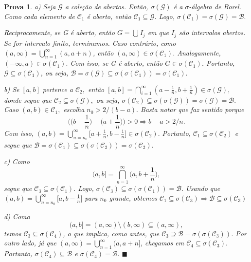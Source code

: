 \documentclass{article}
\newtheorem*{proof*}{\underline{Prova}}
\renewcommand\qedsymbol{$\blacksquare$}
\begin{document}
\begin{proof*}
	a) Seja \(\mathcal{G}\) a coleção de abertos. Então, \(\sigma (\mathcal{G})\) é a \(\sigma \)-álgebra de Borel. Como cada elemento de \(\mathcal{C}_{1}\) é aberto, então \(\mathcal{C}_{1}\subseteq \mathcal{G}.\) Logo,
	\(\sigma(\mathcal{C}_{1}) = \sigma (\mathcal{G}) = \mathcal{B}.\)

	Reciprocamente, se G é aberto, então \(G = \bigcup_{}^{}I_{j}\) em que \(I_{j}\) são intervalos abertos. Se for intervalo finito, terminamos. Caso contrário, como \((a, \infty) = \bigcup_{n=1}^{\infty}(a, a + n)\), então
	\((a, \infty)\in \sigma (\mathcal{C}_{1})\). Analogamente, \((-\infty, a)\in \sigma (\mathcal{C}_{1}).\) Com isso, se G é aberto, então \(G\in \sigma (\mathcal{C}_{1})\). Portanto, \(\mathcal{G}\subseteq \sigma (\mathcal{C}_{1})\), ou seja,
	\(\mathcal{B} = \sigma (\mathcal{G})\subseteq \sigma (\sigma (\mathcal{C}_{1})) = \sigma (\mathcal{C}_{1}).\)

	b) Se \([a, b]\) pertence a \(\mathcal{C}_{2},\) então \([a, b] = \bigcap_{i=1}^{\infty}(a-\frac{1}{n}, b+\frac{1}{n})\in \sigma (\mathcal{G}),\) donde segue que \(\mathcal{C}_{2}\subseteq \sigma (\mathcal{G}),\)
	ou seja, \(\sigma (\mathcal{C}_{2})\subseteq \sigma (\sigma (\mathcal{G})) = \sigma (\mathcal{G}) = \mathcal{B}.\) Caso \((a, b)\in \mathcal{C}_{1},\) escolha \(n_{0} > 2/(b-a).\) Basta notar que faz sentido porque
	\[
		\biggl(\biggl(b-\frac{1}{n}\biggr) - \biggl(a + \frac{1}{n}\biggr)\biggr) > 0 \Rightarrow b - a >2/n.
	\]
	Com isso, \((a, b) = \bigcup_{n=n_{0}}^{\infty}\biggl[a+\frac{1}{n}, b-\frac{1}{n}\biggr]\in \sigma (\mathcal{C}_{2}).\) Portanto, \(\mathcal{C}_{1}\subseteq \sigma (\mathcal{C}_{2})\) e
	segue que \(\mathcal{B} = \sigma (\mathcal{C}_{1})\subseteq \sigma (\sigma (\mathcal{C}_{2})) = \sigma (\mathcal{C}_{2})\).

	c) Como
	\[
		(a, b] = \bigcap_{n=1}^{\infty}\biggl(a, b+\frac{1}{n}\biggr),
	\]
	segue que \(\mathcal{C}_3 \subseteq \sigma (\mathcal{C}_1)\). Logo, \(\sigma (\mathcal{C}_3)\subseteq \sigma (\sigma (\mathcal{C}_1)) = \mathcal{B}.\) Usando que \((a, b) = \bigcup_{n=n_{0}}^{\infty}\biggl[a, b-\frac{1}{n}\biggr]\) para \(n_{0}\) grande,
	obtemos \(\mathcal{C}_{1} \subseteq \sigma (\mathcal{C}_{3}) \Rightarrow \mathcal{B} \subseteq \sigma (\mathcal{C}_3)\)

	d) Como
	\[
		(a, b] = (a, \infty)\setminus{(b, \infty)} \subseteq (a, \infty),
	\]
	temos \(\mathcal{C}_{3}\subseteq \sigma (\mathcal{C}_{4})\), o que implica, como antes, que \(\mathcal{C}_{3}\supseteq  \mathcal{B} = \sigma (\sigma (\mathcal{C}_{3}))\). Por outro lado, já que \((a, \infty) = \bigcup_{n=1}^{\infty}(a, a + n]\), chegamos em
	\(\mathcal{C}_{4} \subseteq \sigma (\mathcal{C}_{3}).\) Portanto, \(\sigma (\mathcal{C}_{4})\subseteq \mathcal{B}\) e \(\sigma (\mathcal{C}_{4}) = \mathcal{B}.\) \qedsymbol
\end{proof*}
\end{document}
